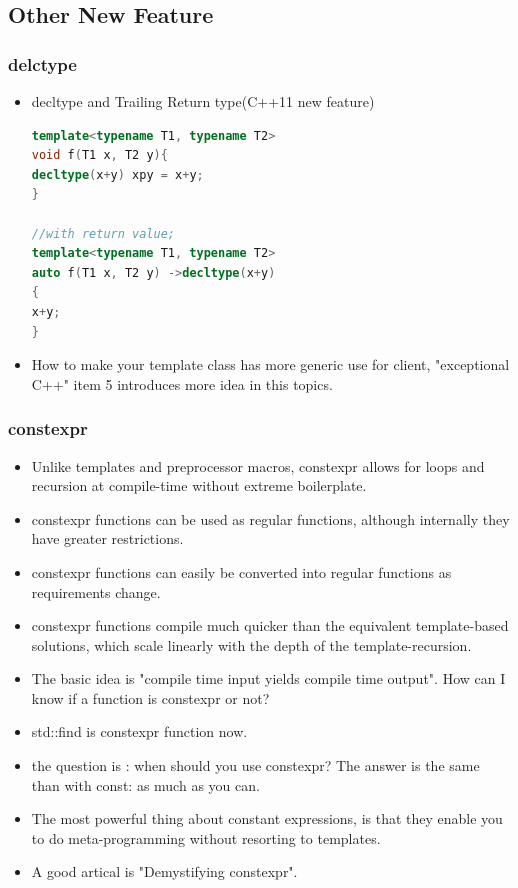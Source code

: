 \documentclass[a4paper,12pt,twoside]{book}
\begin{document}
\subsection{Other New Feature}
\subsubsection{delctype}
\begin{itemize}


\item decltype and  Trailing Return type(C++11 new feature)
\begin{lstlisting}[frame=single, language=c++]
template<typename T1, typename T2>
void f(T1 x, T2 y){
decltype(x+y) xpy = x+y;
}

//with return value;
template<typename T1, typename T2>
auto f(T1 x, T2 y) ->decltype(x+y)
{
x+y;
}
\end{lstlisting}

\item How to make your template class has more generic use for client, "exceptional C++" item 5 introduces more idea in this topics.

\end{itemize}

\subsubsection{constexpr}
\begin{itemize}

\item Unlike templates and preprocessor macros, constexpr allows for loops and recursion at compile-time without extreme boilerplate.

\item constexpr functions can be used as regular functions, although internally they have greater restrictions.

\item constexpr functions can easily be converted into regular functions as requirements change.

\item constexpr functions compile much quicker than the equivalent template-based solutions, which scale linearly with the depth of the template-recursion.

\item The basic idea is "compile time input yields compile time output". How can I know if a function is constexpr or not? 

\item std::find is constexpr function now. 

\item the question is : when should you use constexpr? The answer is the same than with const: as much as you can.

\item The most powerful thing about constant expressions, is that they enable you to do meta-programming without resorting to templates.

\item A good artical is "Demystifying constexpr". 
\end{itemize}
\end{document}
